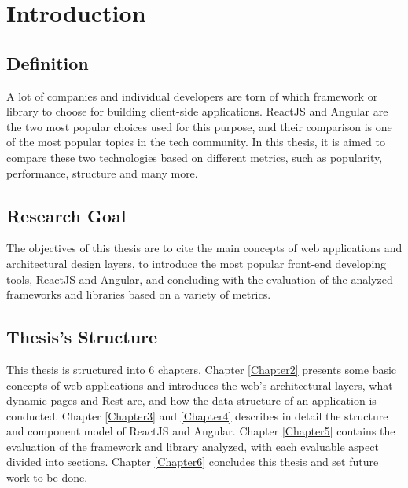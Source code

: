 
\chapter{Introduction} %

\label{Chapter1} %

\section{Definition}
A lot of companies and individual developers are torn of which framework or library to choose for building client-side applications. ReactJS and Angular are the two most popular choices used for this purpose, and their comparison is one of the most popular topics in the tech community. In this thesis, it is aimed to compare these two technologies based on different metrics, such as popularity, performance, structure and many more. \par

\section{Research Goal}
The objectives of this thesis are to cite the main concepts of web applications and architectural design layers, to introduce the most popular front-end developing tools, ReactJS and Angular, and concluding with the evaluation of the analyzed frameworks and libraries based on a variety of metrics.

\section{Thesis's Structure}
This thesis is structured into 6 chapters. Chapter \ref{Chapter2} presents some basic concepts of web applications and introduces the web's architectural layers, what dynamic pages and Rest are, and how the data structure of an application is conducted. Chapter \ref{Chapter3} and \ref{Chapter4} describes in detail the structure and component model of ReactJS and Angular. Chapter \ref{Chapter5} contains the evaluation of the framework and library analyzed, with each evaluable aspect divided into sections. Chapter \ref{Chapter6} concludes this thesis and set future work to be done.